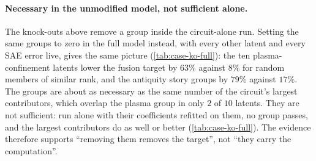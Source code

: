 \documentclass[10pt]{article}
\begin{document}
\paragraph{Necessary in the unmodified model, not sufficient alone.}
The knock-outs above remove a group inside the circuit-alone run.
Setting the same groups to zero in the full model instead, with every other latent and every SAE error live, gives the same picture (\cref{tab:case-ko-full}): the ten plasma-confinement latents lower the fusion target by $63\%$ against $8\%$ for random members of similar rank, and the antiquity story groups by $79\%$ against $17\%$.
The groups are about as necessary as the same number of the circuit's largest contributors, which overlap the plasma group in only $2$ of $10$ latents.
They are not sufficient: run alone with their coefficients refitted on them, no group passes, and the largest contributors do as well or better (\cref{tab:case-ko-full}).
The evidence therefore supports ``removing them removes the target'', not ``they carry the computation''.
\end{document}
